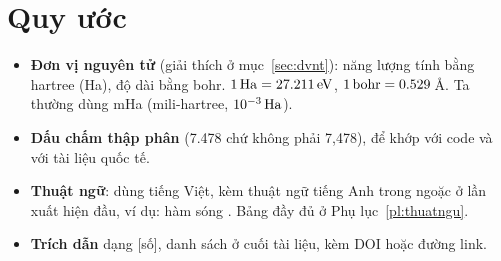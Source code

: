 \section*{Quy ước}
\begin{itemize}
\item \textbf{Đơn vị nguyên tử} (giải thích ở mục~\ref{sec:dvnt}): năng lượng tính bằng hartree (Ha), độ dài bằng bohr. $1\,\mathrm{Ha} = 27.211\,\mathrm{eV}$, $1\,\mathrm{bohr} = 0.529$\,Å. Ta thường dùng mHa (mili-hartree, $10^{-3}\,\mathrm{Ha}$).
\item \textbf{Dấu chấm thập phân} (7.478 chứ không phải 7,478), để khớp với code và với tài liệu quốc tế.
\item \textbf{Thuật ngữ}: dùng tiếng Việt, kèm thuật ngữ tiếng Anh trong ngoặc ở lần xuất hiện đầu, ví dụ: hàm sóng . Bảng đầy đủ ở Phụ lục~\ref{pl:thuatngu}.
\item \textbf{Trích dẫn} dạng [số], danh sách ở cuối tài liệu, kèm DOI hoặc đường link.
\end{itemize}
